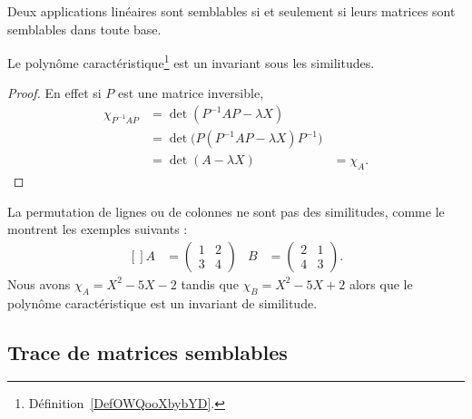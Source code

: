 \begin{proposition}     \label{PROPooBGJBooXlDYEv}
	Deux applications linéaires sont semblables si et seulement si leurs matrices sont semblables dans toute base.
\end{proposition}

\begin{lemma}
	Le polynôme caractéristique\footnote{Définition~\ref{DefOWQooXbybYD}.} est un invariant sous les similitudes.
\end{lemma}

\begin{proof}
	En effet si \( P\) est une matrice inversible,
	\begin{subequations}
		\begin{align}
			\chi_{P^{-1}AP} & = \det(P^{-1}AP-\lambda X)                    \\
			                & = \det\big( P(P^{-1}AP-\lambda X)P^{-1} \big) \\
			                & = \det(A-\lambda X)
			                & = \chi_A.
		\end{align}
	\end{subequations}
\end{proof}

La permutation de lignes ou de colonnes ne sont pas des similitudes, comme le montrent les exemples suivants :
\begin{equation}
	\begin{aligned}[]
		A & =\begin{pmatrix}
			1 & 2 \\
			3 & 4
		\end{pmatrix}  &
		B & =\begin{pmatrix}
			2 & 1 \\
			4 & 3
		\end{pmatrix}.
	\end{aligned}
\end{equation}
Nous avons \( \chi_A=X^2-5X-2\) tandis que \( \chi_B=X^2-5X+2\) alors que le polynôme caractéristique est un invariant de similitude.

\subsection{Trace de matrices semblables}

